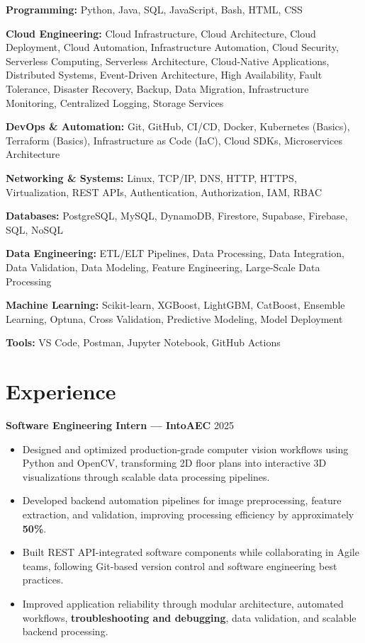\documentclass[9pt]{article}
\begin{document}
\textbf{Programming:} Python, Java, SQL, JavaScript, Bash, HTML, CSS

\textbf{Cloud Engineering:} Cloud Infrastructure, Cloud Architecture, Cloud Deployment, Cloud Automation, Infrastructure Automation, Cloud Security, Serverless Computing, Serverless Architecture, Cloud-Native Applications, Distributed Systems, Event-Driven Architecture, High Availability, Fault Tolerance, Disaster Recovery, Backup, Data Migration, Infrastructure Monitoring, Centralized Logging, Storage Services

\textbf{DevOps \& Automation:} Git, GitHub, CI/CD, Docker, Kubernetes (Basics), Terraform (Basics), Infrastructure as Code (IaC), Cloud SDKs, Microservices Architecture

\textbf{Networking \& Systems:} Linux, TCP/IP, DNS, HTTP, HTTPS, Virtualization, REST APIs, Authentication, Authorization, IAM, RBAC

\textbf{Databases:} PostgreSQL, MySQL, DynamoDB, Firestore, Supabase, Firebase, SQL, NoSQL

\textbf{Data Engineering:} ETL/ELT Pipelines, Data Processing, Data Integration, Data Validation, Data Modeling, Feature Engineering, Large-Scale Data Processing

\textbf{Machine Learning:} Scikit-learn, XGBoost, LightGBM, CatBoost, Ensemble Learning, Optuna, Cross Validation, Predictive Modeling, Model Deployment

\textbf{Tools:} VS Code, Postman, Jupyter Notebook, GitHub Actions


\section*{Experience}
\textbf{Software Engineering Intern — IntoAEC} \hfill 2025
\begin{itemize}
    \item Designed and optimized production-grade computer vision workflows using Python and OpenCV, transforming 2D floor plans into interactive 3D visualizations through scalable data processing pipelines.
    \item Developed backend automation pipelines for image preprocessing, feature extraction, and validation, improving processing efficiency by approximately \textbf{50\%}.
    \item Built REST API-integrated software components while collaborating in Agile teams, following Git-based version control and software engineering best practices.
    \item Improved application reliability through modular architecture, automated workflows, \textbf{troubleshooting and debugging}, data validation, and scalable backend processing.
\end{itemize}
\end{document}

